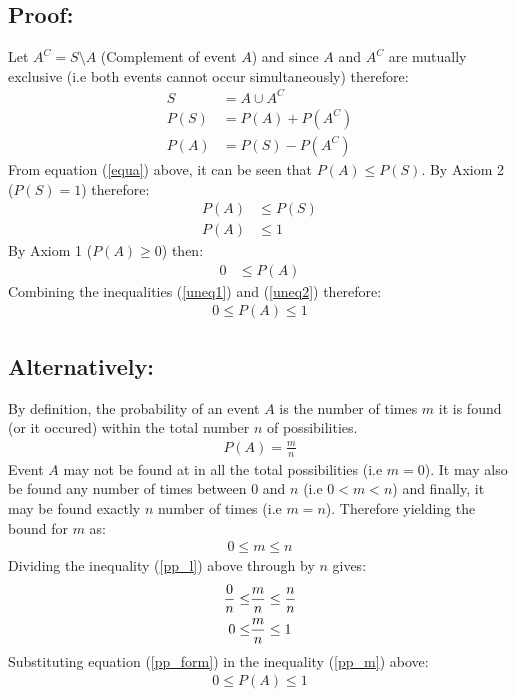 \documentclass[a4paper]{article}
\begin{document}
    \subsection*{Proof:}
    Let $A^C = S \setminus A$ (Complement of event $A$) and since $A$ and $A^C$ are mutually exclusive (i.e both events cannot occur simultaneously) therefore:
    \begin{align}
        S &= A \cup A^C\\
        P(S) &= P(A) + P(A^C)\\
        P(A) &= P(S) - P(A^C) \label{equa}
    \end{align}
    From equation ({\ref{equa}}) above, it can be seen that $P(A) \le P(S)$. By Axiom 2 ($P(S) = 1$) therefore:
    \begin{align}
        P(A) &\le P(S)\\
        P(A) &\le 1 \label{uneq1}
    \end{align}
    By Axiom 1 ($P(A) \ge 0$) then:
    \begin{align} \label{uneq2}
        0 &\le  P(A)
    \end{align}
    Combining the inequalities (\ref{uneq1}) and (\ref{uneq2}) therefore:
    \begin{align}
        0 \le P(A) \le 1
    \end{align}

    \subsection*{Alternatively:}
    By definition, the probability of an event $A$ is the number of times $m$ it is found (or it occured) within the total number $n$ of possibilities.
    \begin{align} \label{pp_form}
        P(A) = \frac{m}{n}
    \end{align}
    Event $A$ may not be found at in all the total possibilities (i.e $m = 0$). It may also be found any number of times between $0$ and $n$ (i.e  $0 < m < n$) and finally, it may be found exactly $n$ number of times (i.e $m = n$). Therefore yielding the bound for $m$ as:
    \begin{align} \label{pp_l}
        0 \le m \le n
    \end{align}
    Dividing the inequality (\ref{pp_l}) above through by $n$ gives:
    \begin{align}
        \frac{0}{n} \le &\frac{m}{n} \le \frac{n}{n} \notag \\
        0 \le &\frac{m}{n} \le 1 \label{pp_m}
    \end{align}
    Substituting equation (\ref{pp_form}) in the inequality (\ref{pp_m}) above:
    \begin{align*}
        0 \le P(A) \le 1
    \end{align*}
\end{document}
